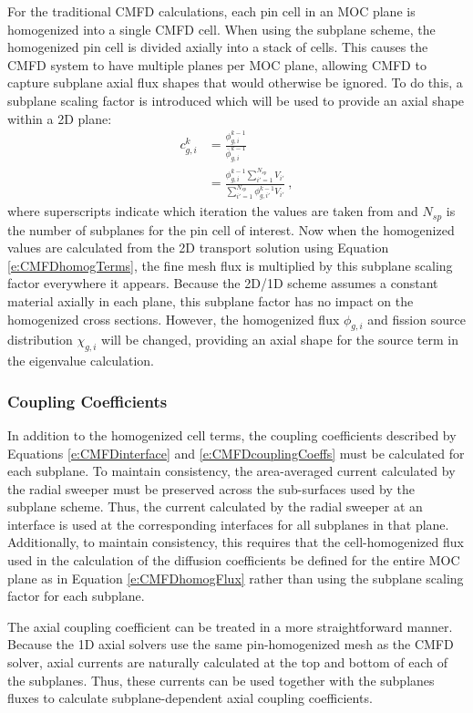 For the traditional CMFD calculations, each pin cell in an MOC plane is homogenized into a single CMFD cell.  When using the subplane scheme, the homogenized pin cell is divided axially into a stack of cells.  This causes the CMFD system to have multiple planes per MOC plane, allowing CMFD to capture subplane axial flux shapes that would otherwise be ignored.  To do this, a subplane scaling factor is introduced which will be used to provide an axial shape within a 2D plane:
\begin{align}\label{e:subplaneScalingFactor}
c_{g,i}^k &= \frac{\phi_{g,i}^{k-1}}{\overline{\phi}_{g,i}^{k-1}} \nonumber\\
 &= \frac{\phi_{g,i}^{k-1} \sum_{i'=1}^{N_{sp}} V_{i'}}{\sum_{i'=1}^{N_{sp}} \phi_{g,i'}^{k-1} V_{i'}}\ ,
\end{align}
where superscripts indicate which iteration the values are taken from and $N_{sp}$ is the number of subplanes for the pin cell of interest.  Now when the homogenized values are calculated from the 2D transport solution using Equation \ref{e:CMFDhomogTerms}, the fine mesh flux is multiplied by this subplane scaling factor everywhere it appears.  Because the 2D/1D scheme assumes a constant material axially in each plane, this subplane factor has no impact on the homogenized cross sections.  However, the homogenized flux $\phi_{g,i}$ and fission source distribution $\chi_{g,i}$ will be changed, providing an axial shape for the source term in the eigenvalue calculation.

\subsubsection{Coupling Coefficients}

In addition to the homogenized cell terms, the coupling coefficients described by Equations \ref{e:CMFDinterface} and \ref{e:CMFDcouplingCoeffs} must be calculated for each subplane.  To maintain consistency, the area-averaged current calculated by the radial sweeper must be preserved across the sub-surfaces used by the subplane scheme.  Thus, the current calculated by the radial sweeper at an interface is used at the corresponding interfaces for all subplanes in that plane.  Additionally, to maintain consistency, this requires that the cell-homogenized flux used in the calculation of the diffusion coefficients be defined for the entire MOC plane as in Equation \ref{e:CMFDhomogFlux} rather than using the subplane scaling factor for each subplane.

The axial coupling coefficient can be treated in a more straightforward manner.  Because the 1D axial solvers use the same pin-homogenized mesh as the CMFD solver, axial currents are naturally calculated at the top and bottom of each of the subplanes.  Thus, these currents can be used together with the subplanes fluxes to calculate subplane-dependent axial coupling coefficients.


